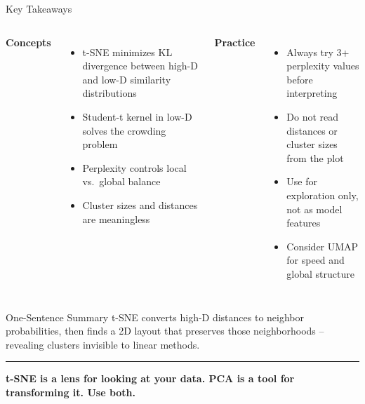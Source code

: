 \documentclass[8pt,aspectratio=169]{beamer}
\newcommand{\bottomnote}[1]{%
\vfill
\vspace{-2mm}
\textcolor{mllavender2}{\rule{\textwidth}{0.4pt}}
\vspace{1mm}
\footnotesize
\textbf{#1}
}
\newenvironment{compactlist}{%
  \begin{itemize}%
    \setlength{\itemsep}{2pt}%
    \setlength{\parskip}{0pt}%
    \setlength{\parsep}{0pt}%
}{%
  \end{itemize}%
}
\begin{document}
\begin{frame}[t]{Key Takeaways}
\begin{columns}[T]
\small
\textbf{Concepts}
\begin{compactlist}
\item t-SNE minimizes KL divergence between high-D and low-D similarity distributions
\item Student-t kernel in low-D solves the crowding problem
\item Perplexity controls local vs.\ global balance
\item Cluster sizes and distances are meaningless
\end{compactlist}

\small
\textbf{Practice}
\begin{compactlist}
\item Always try 3+ perplexity values before interpreting
\item Do not read distances or cluster sizes from the plot
\item Use for exploration only, not as model features
\item Consider UMAP for speed and global structure
\end{compactlist}
\end{columns}

\vspace{4mm}
\begin{block}{One-Sentence Summary}
\scriptsize t-SNE converts high-D distances to neighbor probabilities, then finds a 2D layout that preserves those neighborhoods -- revealing clusters invisible to linear methods.
\end{block}

\bottomnote{t-SNE is a lens for looking at your data. PCA is a tool for transforming it. Use both.}
\end{frame}
\end{document}
